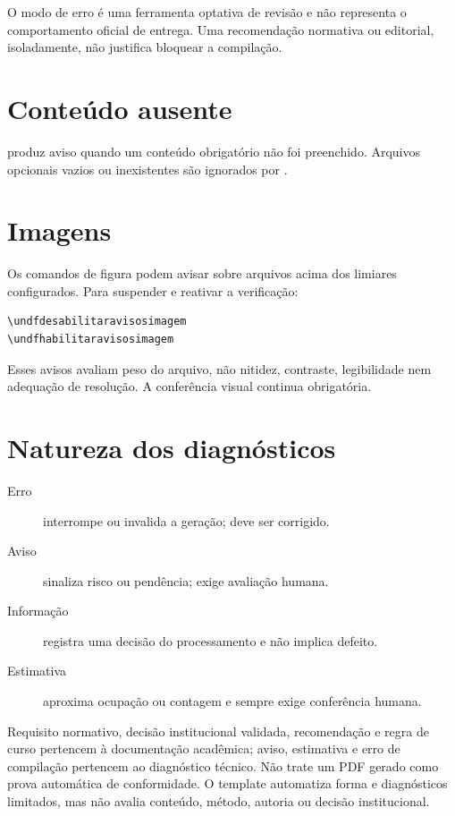 O modo de erro é uma ferramenta optativa de revisão e não representa o comportamento oficial de entrega. Uma recomendação normativa ou editorial, isoladamente, não justifica bloquear a compilação.

\section{Conteúdo ausente}

\texttt{\string\undfwarnifempty} produz aviso quando um conteúdo obrigatório não foi preenchido. Arquivos opcionais vazios ou inexistentes são ignorados por \texttt{\string\undfinputoptional}.

\section{Imagens}

Os comandos de figura podem avisar sobre arquivos acima dos limiares configurados. Para suspender e reativar a verificação:

\begin{lstlisting}
\undfdesabilitaravisosimagem
\undfhabilitaravisosimagem
\end{lstlisting}

Esses avisos avaliam peso do arquivo, não nitidez, contraste, legibilidade nem adequação de resolução. A conferência visual continua obrigatória.

\section{Natureza dos diagnósticos}

\begin{description}
  \item[Erro] interrompe ou invalida a geração; deve ser corrigido.
  \item[Aviso] sinaliza risco ou pendência; exige avaliação humana.
  \item[Informação] registra uma decisão do processamento e não implica defeito.
  \item[Estimativa] aproxima ocupação ou contagem e sempre exige conferência humana.
\end{description}

Requisito normativo, decisão institucional validada, recomendação e regra de curso pertencem à documentação acadêmica; aviso, estimativa e erro de compilação pertencem ao diagnóstico técnico. Não trate um PDF gerado como prova automática de conformidade. O template automatiza forma e diagnósticos limitados, mas não avalia conteúdo, método, autoria ou decisão institucional.

